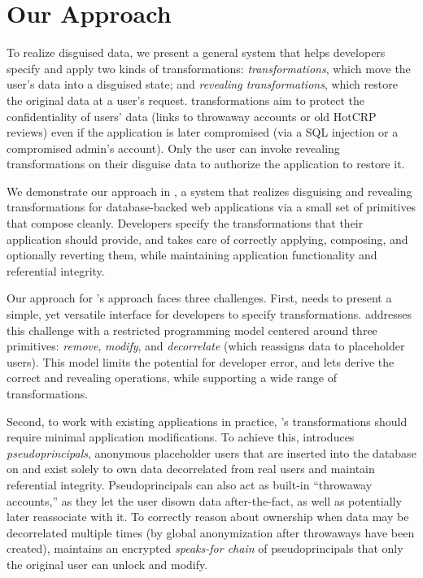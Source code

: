 \section{Our Approach}
%
To realize disguised data, we present a general system that helps developers
specify and apply two kinds of transformations: \emph{\xxing transformations},
which move the user's data into a disguised state; and \emph{revealing
transformations}, which restore the original data at a user’s request.
%
\Xxing transformations aim to protect the confidentiality of users' \xxed data
(\eg links to throwaway accounts or old HotCRP reviews) even if the application
is later compromised (\eg via a SQL injection or a compromised admin's account).
%
Only the user can invoke revealing transformations on their disguise data to
authorize the application to restore it.
%

%
We demonstrate our approach in \sys, a system that realizes disguising and
revealing transformations for database-backed web applications via a small set of
primitives that compose cleanly.
%
Developers specify the transformations that their application should provide,
and \sys takes care of correctly applying, composing, and optionally reverting
them, while maintaining application functionality and referential integrity.
%

Our approach for \sys's approach faces three challenges.
First, \sys needs to present a simple, yet versatile interface for developers to
specify \xxing transformations.
%
\sys addresses this challenge with a restricted programming model centered
around three primitives: \emph{remove}, \emph{modify}, and \emph{decorrelate} (which reassigns data
to placeholder users).
%
This model limits the potential for developer error, and lets \sys derive the
correct \xxing and revealing operations, while supporting a wide range of
transformations.
%

%
Second, to work with existing applications in practice, \sys's \xxing
transformations should require minimal application modifications.
%
To achieve this, \sys introduces \emph{pseudoprincipals}, anonymous placeholder
users that are inserted into the database on \xxing and exist solely to own data
decorrelated from real users and maintain referential integrity.
%
Pseudoprincipals can also act as built-in ``throwaway accounts,'' as they let
the user disown data after-the-fact, as well as potentially later reassociate
with it.
%
To correctly reason about ownership when data may be decorrelated multiple times
(\eg by global anonymization after throwaways have been created), \sys maintains
an encrypted \emph{speaks-for chain} of pseudoprincipals that only the original user
can unlock and modify.
%

